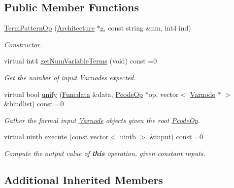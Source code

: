 \subsection*{Public Member Functions}
\begin{DoxyCompactItemize}
\item 
\mbox{\hyperlink{class_term_pattern_op_a49bee3b1a5a9dcd0f037129f4d387d4d}{Term\+Pattern\+Op}} (\mbox{\hyperlink{class_architecture}{Architecture}} $\ast$g, const string \&nm, int4 ind)
\begin{DoxyCompactList}\small\item\em \mbox{\hyperlink{class_constructor}{Constructor}}. \end{DoxyCompactList}\item 
virtual int4 \mbox{\hyperlink{class_term_pattern_op_a3978a156aa6681432b937361a2294f5d}{get\+Num\+Variable\+Terms}} (void) const =0
\begin{DoxyCompactList}\small\item\em Get the number of input Varnodes expected. \end{DoxyCompactList}\item 
virtual bool \mbox{\hyperlink{class_term_pattern_op_afe2a8a69c8f803e3134eaaaf087cc0b0}{unify}} (\mbox{\hyperlink{class_funcdata}{Funcdata}} \&data, \mbox{\hyperlink{class_pcode_op}{Pcode\+Op}} $\ast$op, vector$<$ \mbox{\hyperlink{class_varnode}{Varnode}} $\ast$ $>$ \&bindlist) const =0
\begin{DoxyCompactList}\small\item\em Gather the formal input \mbox{\hyperlink{class_varnode}{Varnode}} objects given the root \mbox{\hyperlink{class_pcode_op}{Pcode\+Op}}. \end{DoxyCompactList}\item 
virtual \mbox{\hyperlink{types_8h_a2db313c5d32a12b01d26ac9b3bca178f}{uintb}} \mbox{\hyperlink{class_term_pattern_op_a766fd191b337e60fb882b2e7bc9b42a6}{execute}} (const vector$<$ \mbox{\hyperlink{types_8h_a2db313c5d32a12b01d26ac9b3bca178f}{uintb}} $>$ \&input) const =0
\begin{DoxyCompactList}\small\item\em Compute the output value of {\bfseries{this}} operation, given constant inputs. \end{DoxyCompactList}\end{DoxyCompactItemize}
\subsection*{Additional Inherited Members}


